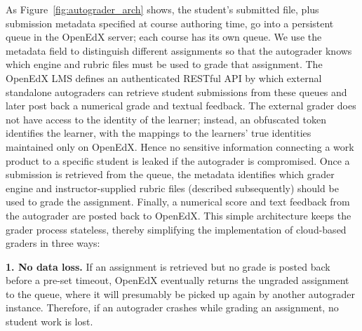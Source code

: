 As Figure~\ref{fig:autograder_arch} shows, 
the student's submitted file, plus
submission metadata specified at course authoring time, go into a
persistent queue in the OpenEdX server; each course has its own queue.
We use the metadata field to distinguish different
assignments so that the autograder knows which engine and rubric files
must be used to grade that assignment.
The OpenEdX LMS defines an authenticated RESTful
API
by which external standalone autograders can retrieve student
submissions from these queues and later post back a numerical grade and
textual feedback.
The external grader does not have access to the identity of the learner;
instead, an obfuscated token identifies the learner, with the mappings
to the learners' true identities maintained only on OpenEdX.
Hence no sensitive information connecting a work product to a specific
student is leaked if the autograder is compromised.
Once a submission is retrieved from the queue, the metadata identifies
which grader engine and instructor-supplied rubric files (described
subsequently) should be 
used to grade the assignment.  Finally, a numerical score and 
text feedback from the autograder 
are posted back to OpenEdX.
This simple architecture keeps the grader process stateless, thereby 
simplifying the implementation of cloud-based graders in three ways:

\noindent\textbf{1. No data loss.}
If an assignment is retrieved but no grade is posted back before
a pre-set timeout, OpenEdX eventually returns the ungraded assignment to
the queue, where it will presumably be picked up again by another
autograder instance.
Therefore, if an autograder crashes while grading an assignment, no
student work is lost.

